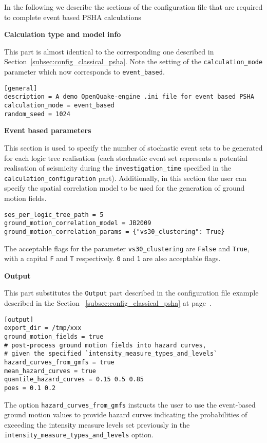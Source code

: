 In the following we describe the sections of the configuration file that are
required to complete event based PSHA calculations


\textbf{Calculation type and model info}

This part is almost identical to the corresponding one described in
Section~\ref{subsec:config_classical_psha}. Note the setting of the
\texttt{calculation\_mode} parameter which now corresponds to
\texttt{event\_based}.

\begin{verbatim}
[general]
description = A demo OpenQuake-engine .ini file for event based PSHA
calculation_mode = event_based
random_seed = 1024
\end{verbatim}

\textbf{Event based parameters}

This section is used to specify the number of stochastic event sets to be
generated for each logic tree realisation  (each stochastic event set
represents a potential realisation of seismicity during the
\texttt{investigation\_time} specified in the
\texttt{calculation\_configuration} part). Additionally, in this section the user can specify the spatial correlation model to be used for the
generation of ground motion fields.

\begin{verbatim}
ses_per_logic_tree_path = 5
ground_motion_correlation_model = JB2009
ground_motion_correlation_params = {"vs30_clustering": True}
\end{verbatim}

The acceptable flags for the parameter \verb+vs30_clustering+ are \verb+False+ and \verb+True+, with a capital \verb+F+ and \verb+T+ respectively. \verb+0+ and \verb+1+ are also acceptable flags.

\textbf{Output}

This part substitutes the \texttt{Output} part described in  the configuration
file example described in the Section~ \ref{subsec:config_classical_psha} at
page~\pageref{subsec:config_classical_psha}.

\begin{verbatim}
[output]
export_dir = /tmp/xxx
ground_motion_fields = true
# post-process ground motion fields into hazard curves,
# given the specified `intensity_measure_types_and_levels`
hazard_curves_from_gmfs = true
mean_hazard_curves = true
quantile_hazard_curves = 0.15 0.5 0.85
poes = 0.1 0.2
\end{verbatim}

The option \verb=hazard_curves_from_gmfs= instructs the user to use the event-based ground motion values to provide hazard curves indicating the probabilities of exceeding the intensity measure levels set previously in the \verb=intensity_measure_types_and_levels= option.
